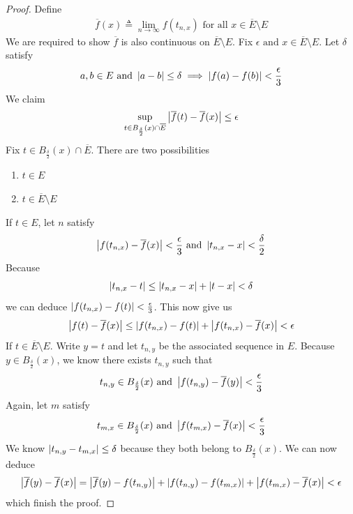 \documentclass{report}
\begin{document}
\begin{proof}
Define 
\begin{align*}
\overline{f}(x)\triangleq \lim_{n\to \infty}f(t_{n,x})\text{ for all }x\in \overline{E}\setminus E
\end{align*}
We are required to show $\overline{f}$ is also continuous on $\overline{E}\setminus E$. Fix $\epsilon \text{ and }x \in \overline{E}\setminus E$. Let $\delta$ satisfy 
\begin{align*}
a,b \in E\text{ and }\left|a-b\right|\leq \delta \implies \left|f(a)-f(b)\right|<\frac{\epsilon}{3}
\end{align*}
We claim 
\begin{align*}
\sup_{t \in B_{\frac{\delta}{2}}(x)\cap \overline{E}} \left|\overline{f}(t)-\overline{f}(x)\right|\leq \epsilon 
\end{align*}
Fix $t\in B_{\frac{\delta}{2}}(x)\cap \overline{E}$. There are two possibilities 
\begin{enumerate}[label=(\alph*)]
  \item $t\in E$
  \item $t \in \overline{E}\setminus E$
\end{enumerate}
If $t\in E$, let $n$ satisfy 
 \begin{align*}
\left|f(t_{n,x})-\overline{f}(x)\right|<\frac{\epsilon}{3}\text{ and }\left|t_{n,x}-x\right|< \frac{\delta}{2}
\end{align*}
Because 
\begin{align*}
\left|t_{n,x}-t\right|\leq \left|t_{n,x}-x\right|+ \left|t-x\right|<\delta
\end{align*}
we can deduce $\left|f(t_{n,x})-f(t)\right|<\frac{\epsilon}{3}$. This now give us 
\begin{align*}
\left|f(t)-\overline{f}(x)\right|\leq \left|f(t_{n,x})-f(t)\right|+ \left|f(t_{n,x})-\overline{f}(x)\right|<\epsilon 
\end{align*}
If $t \in \overline{E}\setminus E$. Write $y=t$ and let  $t_{n,y}$ be the associated sequence in $E$. Because $y \in B_{\frac{\delta}{2}}(x)$, we know there exists $t_{n,y}$ such that 
\begin{align*}
t_{n,y} \in B_{\frac{\delta}{2}}(x)\text{ and }\left|f(t_{n,y})-\overline{f}(y)\right|< \frac{\epsilon}{3}
\end{align*}
Again, let $m$ satisfy 
\begin{align*}
t_{m,x} \in B_{\frac{\delta}{2}}(x)\text{ and }\left|f(t_{m,x})-\overline{f}(x)\right|<\frac{\epsilon}{3}
\end{align*}
We know $\left|t_{n,y}-t_{m,x}\right|\leq \delta $ because they both belong to $B_{\frac{\delta}{2}}(x)$. We can now deduce 
\begin{align*}
\left|\overline{f}(y)-\overline{f}(x)\right|= \left|\overline{f}(y)-f(t_{n,y})\right|+\left|f(t_{n,y})-f(t_{m,x})\right|+ \left|f(t_{m,x})-\overline{f}(x)\right|<\epsilon 
\end{align*}
which finish the proof.
\end{proof}
\end{document}
